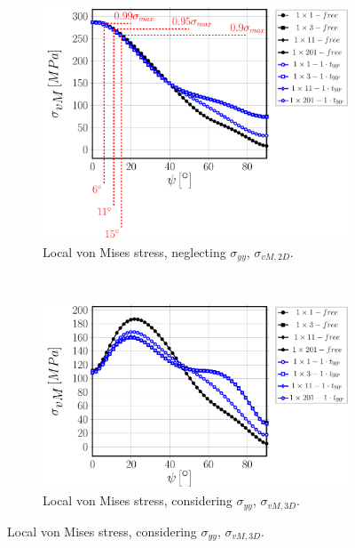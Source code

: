 \begin{figure}[!hp]
    \begin{subfigure}[b]{0.4\textwidth}
        \includegraphics[width=\textwidth]{paperE/vf60-nodamage-vM2D.pdf}
        \caption{Local von Mises stress, neglecting $\sigma_{yy}$, $\sigma_{vM,2D}$.}\label{chap3:paperE:fig:stress-e}
    \end{subfigure} ~
    \begin{subfigure}[b]{0.4\textwidth}
        \includegraphics[width=\textwidth]{paperE/vf60-nodamage-vM3D.pdf}
        \caption{Local von Mises stress, considering $\sigma_{yy}$, $\sigma_{vM,3D}$.}\label{chap3:paperE:fig:stress-f}
    \end{subfigure}


\end{figure}

